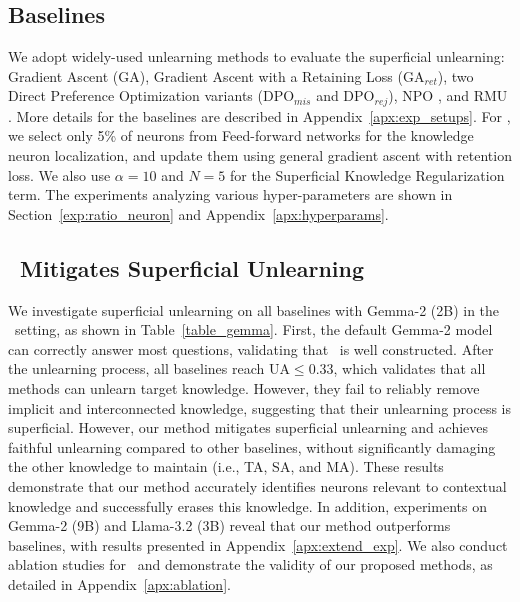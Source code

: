 \subsection{Baselines}
We adopt widely-used unlearning methods to evaluate the superficial unlearning: Gradient Ascent (GA), Gradient Ascent with a Retaining Loss (GA$_{ret}$), two Direct Preference Optimization variants (DPO$_{mis}$ and DPO$_{rej}$), NPO \citep{zhang2024negative}, and RMU \citep{li2024wmdp}.
More details for the baselines are described in Appendix~\ref{apx:exp_setups}.
For \ourmodel, we select only 5\% of neurons from Feed-forward networks for the knowledge neuron localization, and update them using general gradient ascent with retention loss.
We also use $\alpha = 10$ and $N = 5$ for the Superficial Knowledge Regularization term.
The experiments analyzing various hyper-parameters are shown in Section~\ref{exp:ratio_neuron} and Appendix~\ref{apx:hyperparams}.











\subsection{\ourmodel~Mitigates Superficial Unlearning}
We investigate superficial unlearning on all baselines with Gemma-2 (2B) in the \ourdata~setting, as shown in Table~\ref{table_gemma}.
First, the default Gemma-2 model can correctly answer most questions, validating that \ourdata~is well constructed.
After the unlearning process, all baselines reach UA$\leq 0.33$, which validates that all methods can unlearn target knowledge.
However, they fail to reliably remove implicit and interconnected knowledge, suggesting that their unlearning process is superficial.
However, our method mitigates superficial unlearning and achieves faithful unlearning compared to other baselines, without significantly damaging the other knowledge to maintain (i.e., TA, SA, and MA).
These results demonstrate that our method accurately identifies neurons relevant to contextual knowledge and successfully erases this knowledge.
In addition, experiments on Gemma-2 (9B) and Llama-3.2 (3B) reveal that our method outperforms baselines, with results presented in Appendix~\ref{apx:extend_exp}.
We also conduct ablation studies for \ourmodel~and demonstrate the validity of our proposed methods, as detailed in Appendix~\ref{apx:ablation}.





